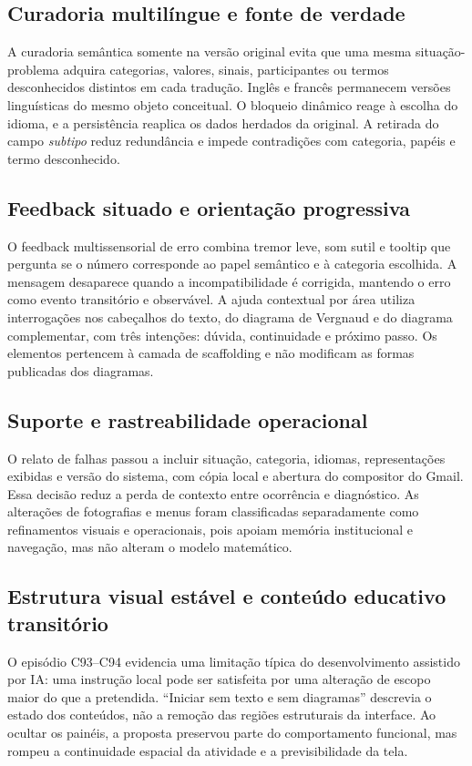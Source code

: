\documentclass[preprint,12pt,authoryear]{elsarticle}
\begin{document}
\subsection{Curadoria multilíngue e fonte de verdade}
A curadoria semântica somente na versão original evita que uma mesma situação-problema adquira categorias, valores, sinais, participantes ou termos desconhecidos distintos em cada tradução. Inglês e francês permanecem versões linguísticas do mesmo objeto conceitual. O bloqueio dinâmico reage à escolha do idioma, e a persistência reaplica os dados herdados da original. A retirada do campo \emph{subtipo} reduz redundância e impede contradições com categoria, papéis e termo desconhecido.

\subsection{Feedback situado e orientação progressiva}
O feedback multissensorial de erro combina tremor leve, som sutil e tooltip que pergunta se o número corresponde ao papel semântico e à categoria escolhida. A mensagem desaparece quando a incompatibilidade é corrigida, mantendo o erro como evento transitório e observável. A ajuda contextual por área utiliza interrogações nos cabeçalhos do texto, do diagrama de Vergnaud e do diagrama complementar, com três intenções: dúvida, continuidade e próximo passo. Os elementos pertencem à camada de scaffolding e não modificam as formas publicadas dos diagramas.

\subsection{Suporte e rastreabilidade operacional}
O relato de falhas passou a incluir situação, categoria, idiomas, representações exibidas e versão do sistema, com cópia local e abertura do compositor do Gmail. Essa decisão reduz a perda de contexto entre ocorrência e diagnóstico. As alterações de fotografias e menus foram classificadas separadamente como refinamentos visuais e operacionais, pois apoiam memória institucional e navegação, mas não alteram o modelo matemático.

\subsection{Estrutura visual estável e conteúdo educativo transitório}
O episódio C93--C94 evidencia uma limitação típica do desenvolvimento assistido por IA: uma instrução local pode ser satisfeita por uma alteração de escopo maior do que a pretendida. ``Iniciar sem texto e sem diagramas'' descrevia o estado dos conteúdos, não a remoção das regiões estruturais da interface. Ao ocultar os painéis, a proposta preservou parte do comportamento funcional, mas rompeu a continuidade espacial da atividade e a previsibilidade da tela.
\end{document}
